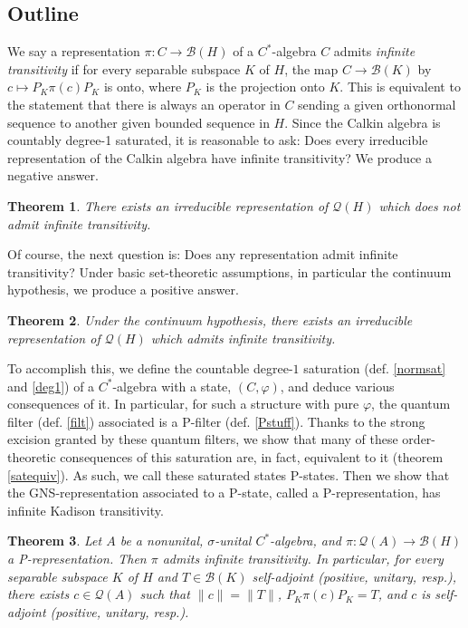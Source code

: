 \documentclass[10pt]{amsart}
\newtheorem{introthm}{Theorem}
\theoremstyle{definition}
\begin{document}
\subsection{Outline}

We say a representation $\pi:C\rightarrow\mathscr{B}(H)$ of a $C^*$-algebra $C$ admits \textit{infinite transitivity} if for every separable subspace $K$ of $H$, the map $C\rightarrow \mathscr{B}(K)$ by $c\mapsto P_K\pi(c)P_K$ is onto, where $P_K$ is the projection onto $K$. This is equivalent to the statement that there is always an operator in $C$ sending a given orthonormal sequence to another given bounded sequence in $H$. Since the Calkin algebra is countably degree-1 saturated, it is reasonable to ask: Does every irreducible representation of the Calkin algebra have infinite transitivity? We produce a negative answer.

\begin{introthm}\label{counter}
    There exists an irreducible representation of $\mathscr{Q}(H)$ which does not admit infinite transitivity.
\end{introthm}

Of course, the next question is: Does any representation admit infinite transitivity? Under basic set-theoretic assumptions, in particular the continuum hypothesis, we produce a positive answer.

\begin{introthm}
    Under the continuum hypothesis, there exists an irreducible representation of $\mathscr{Q}(H)$ which admits infinite transitivity.
\end{introthm}

To accomplish this, we define the countable degree-$1$ saturation (def. \ref{normsat} and \ref{deg1}) of a $C^*$-algebra with a state, $(C,\varphi)$, and deduce various consequences of it. In particular, for such a structure with pure $\varphi$, the quantum filter (def. \ref{filt}) associated is a P-filter (def. \ref{Pstuff}). Thanks to the strong excision granted by these quantum filters, we show that many of these order-theoretic consequences of this saturation are, in fact, equivalent to it (theorem \ref{satequiv}). As such, we call these saturated states P-states. Then we show that the GNS-representation associated to a P-state, called a P-representation, has infinite Kadison transitivity.

\begin{introthm}\label{iktt}
    Let $A$ be a nonunital, $\sigma$-unital $C^*$-algebra, and $\pi:\mathscr{Q}(A)\rightarrow\mathscr{B}(H)$ a P-representation. Then $\pi$ admits infinite transitivity. In particular, for every separable subspace $K$ of $H$ and $T\in\mathscr{B}(K)$ self-adjoint (positive, unitary, resp.), there exists $c\in\mathscr{Q}(A)$ such that $\|c\|=\|T\|$, $P_K\pi(c)P_K=T$, and $c$ is self-adjoint (positive, unitary, resp.).
\end{introthm}
\end{document}
